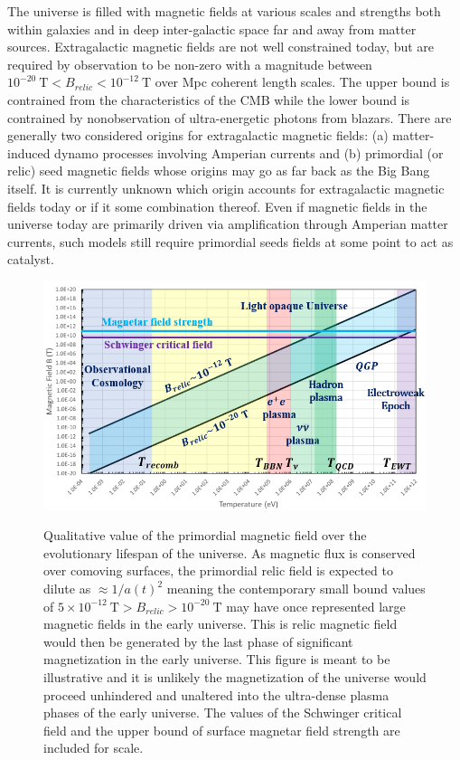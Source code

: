\documentclass[Universe,article,submit,moreauthors,pdftex]{Definitions/mdpi}
\begin{document}
The universe is filled with magnetic fields at various scales and strengths both within galaxies and in deep inter-galactic space far and away from matter sources. Extragalactic magnetic fields are not well constrained today, but are required by observation to be non-zero with a magnitude between $10^{-20}\ \mathrm{T}<B_{relic}<10^{-12}\ \mathrm{T}$ over Mpc coherent length scales. The upper bound is contrained from the characteristics of the CMB while the lower bound is contrained by nonobservation of ultra-energetic photons from blazars. There are generally two considered origins for extragalactic magnetic fields: (a) matter-induced dynamo processes involving Amperian currents and (b) primordial (or relic) seed magnetic fields whose origins may go as far back as the Big Bang itself. It is currently unknown which origin accounts for extragalactic magnetic fields today or if it some combination thereof. Even if magnetic fields in the universe today are primarily driven via amplification through Amperian matter currents, such models still require primordial seeds fields at some point to act as catalyst.
\begin{figure}[t]
  \includegraphics[scale=0.75]{relic_plot.PNG}
  \label{fig1}
  \caption{Qualitative value of the primordial magnetic field over the evolutionary lifespan of the universe. As magnetic flux is conserved over comoving surfaces, the primordial relic field is expected to dilute as $\approx1/a(t)^{2}$ meaning the contemporary small bound values of $5\times10^{-12}\ \mathrm{T}>B_{relic}>10^{-20}\ \mathrm{T}$ may have once represented large magnetic fields in the early universe. This is relic magnetic field would then be generated by the last phase of significant magnetization in the early universe. This figure is meant to be illustrative and it is unlikely the magnetization of the universe would proceed unhindered and unaltered into the ultra-dense plasma phases of the early universe. The values of the Schwinger critical field and the upper bound of surface magnetar field strength are included for scale.}
  \centering
\end{figure}
\end{document}
